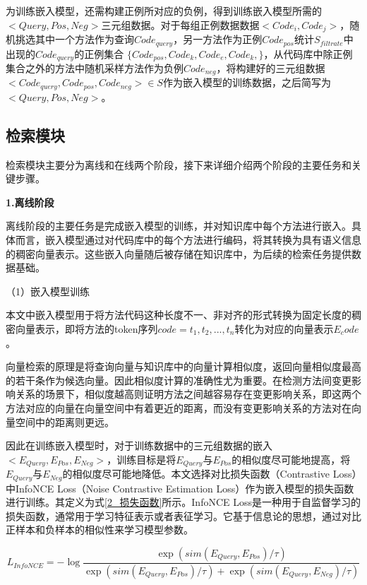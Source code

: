 为训练嵌入模型，还需构建正例所对应的负例，得到训练嵌入模型所需的$<Query,Pos,Neg>$三元组数据。对于每组正例数据数据$<Code_i,Code_j>$，随机挑选其中一个方法作为查询$Code_{query}$，另一方法作为正例$Code_{pos}$统计$S_{filtrate}$中出现的$Code_{query}$的正例集合 $\{Code_{pos},Code_k,Code_e,Code_k,\}$，从代码库中除正例集合之外的方法中随机采样方法作为负例$Code_{neg}$，将构建好的三元组数据$<Code_{query},Code_{pos},Code_{neg}>\in S$作为嵌入模型的训练数据，之后简写为$<Query,Pos,Neg>$。




\subsection{检索模块}

检索模块主要分为离线和在线两个阶段，接下来详细介绍两个阶段的主要任务和关键步骤。

\noindent \textbf{1.离线阶段}

离线阶段的主要任务是完成嵌入模型的训练，并对知识库中每个方法进行嵌入。具体而言，嵌入模型通过对代码库中的每个方法进行编码，将其转换为具有语义信息的稠密向量表示。这些嵌入向量随后被存储在知识库中，为后续的检索任务提供数据基础。

（1）嵌入模型训练

本文中嵌入模型用于将方法代码这种长度不一、非对齐的形式转换为固定长度的稠密向量表示，即将方法的token序列$code={t_1, t_2, ..., t_n}$转化为对应的向量表示$E_code$。

向量检索的原理是将查询向量与知识库中的向量计算相似度，返回向量相似度最高的若干条作为候选向量。因此相似度计算的准确性尤为重要。在检测方法间变更影响关系的场景下，相似度越高则证明方法之间越容易存在变更影响关系，即这两个方法对应的向量在向量空间中有着更近的距离，而没有变更影响关系的方法对在向量空间中的距离则更远。

因此在训练嵌入模型时，对于训练数据中的三元组数据的嵌入$<E_{Query},E_{Pos},E_{Neg}>$，训练目标是将$E_{Query}$与$E_{Pos}$的相似度尽可能地提高，将$E_{Query}$与$E_{Neg}$的相似度尽可能地降低。本文选择对比损失函数（Contrastive Loss）中InfoNCE Loss（Noise Contrastive Estimation Loss）作为嵌入模型的损失函数进行训练。其定义为式\ref{2_损失函数}所示。InfoNCE Loss是一种用于自监督学习的损失函数，通常用于学习特征表示或者表征学习。它基于信息论的思想，通过对比正样本和负样本的相似性来学习模型参数。

\begin{equation}
    L_{InfoNCE} = -\log\frac{\exp(sim(E_{Query}, E_{Pos}) / \tau)}{\exp(sim(E_{Query}, E_{Pos}) / \tau)+\exp(sim(E_{Query}, E_{Neg}) / \tau)}
    \label{2_损失函数}
\end{equation}


